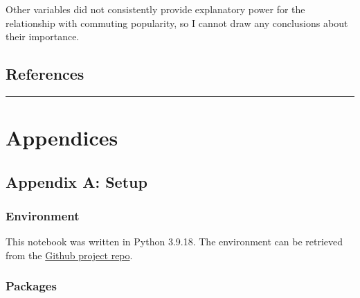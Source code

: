 \documentclass[
  number]{elsarticle}
\begin{document}
Other variables did not consistently provide explanatory power for the
relationship with commuting popularity, so I cannot draw any conclusions
about their importance.

\subsection*{References}\label{references}

\renewcommand{\bibsection}{}


\begin{center}\rule{0.5\linewidth}{0.5pt}\end{center}

\section{Appendices}\label{sec-appendices}

\subsection{Appendix A: Setup}\label{sec-setup}

\subsubsection{Environment}\label{sec-environment}

This notebook was written in Python 3.9.18. The environment can be
retrieved from the \href{https://github.com/2601547/commute}{Github
project repo}.

\subsubsection{Packages}\label{sec-packages}
\end{document}
